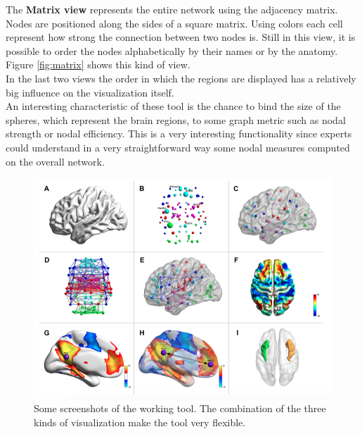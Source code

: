 \documentclass{article}
\begin{document}
\begin{multicols}{2}

The \textbf{Matrix view} represents the entire network using the adjacency matrix. Nodes are positioned along the sides of a square matrix. Using colors each cell represent how strong the connection between two nodes is. Still in this view, it is possible to order the nodes alphabetically by their names or by the anatomy. Figure \ref{fig:matrix} shows this kind of view.\\


In the last two views the order in which the regions are displayed has a relatively big influence on the visualization itself. \\
An interesting characteristic of these tool is the chance to bind the size of the spheres, which represent the brain regions, to some graph metric such as nodal strength or nodal efficiency. This is a very interesting functionality since experts could understand in a very straightforward way some nodal measures computed on the overall network.\\

%
%
\begin{figure}[ht]
\centerline{\includegraphics[width=1.9\columnwidth]{brain2}}
\caption{Some screenshots of the working tool. The combination of the three kinds of visualization make the tool very flexible.}
    \label{fig:brain2}
\end{figure}


\end{multicols}
\end{document}

